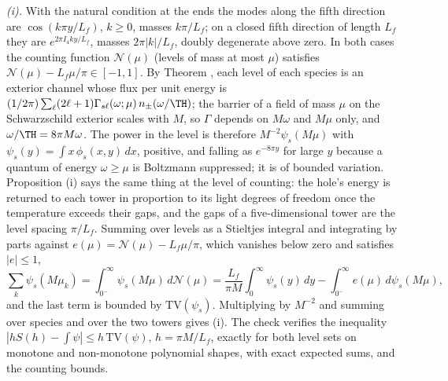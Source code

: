 \emph{(i).} With the natural condition at the ends the modes along the fifth direction are $\cos(k\pi y/L_{f})$, $k \ge 0$, masses $k\pi/L_{f}$; on a closed fifth direction of length $L_{f}$ they are $e^{2\pi I_4 k y/L_{f}}$, masses $2\pi|k|/L_{f}$, doubly degenerate above zero. In both cases the counting function $\mathcal{N}(\mu)$ (levels of mass at most $\mu$) satisfies $\mathcal{N}(\mu) - L_{f}\mu/\pi \in [-1, 1]$. By Theorem , each level of each species is an exterior channel whose flux per unit energy is $(1/2\pi)\sum_{\ell}(2\ell+1)\Gamma_{s\ell}(\omega;\mu)\,n_{\pm}(\omega/\TH)$; the barrier of a field of mass $\mu$ on the Schwarzschild exterior scales with $M$, so $\Gamma$ depends on $M\omega$ and $M\mu$ only, and $\omega/\TH = 8\pi M\omega$. The power in the level is therefore $M^{-2}\psi_{s}(M\mu)$ with $\psi_{s}(y) = \int x\,\phi_{s}(x, y)\,dx$, positive, and falling as $e^{-8\pi y}$ for large $y$ because a quantum of energy $\omega \ge \mu$ is Boltzmann suppressed; it is of bounded variation. Proposition (i) says the same thing at the level of counting: the hole's energy is returned to each tower in proportion to its light degrees of freedom once the temperature exceeds their gaps, and the gaps of a five-dimensional tower are the level spacing $\pi/L_{f}$. Summing over levels as a Stieltjes integral and integrating by parts against $e(\mu) = \mathcal{N}(\mu) - L_{f}\mu/\pi$, which vanishes below zero and satisfies $|e| \le 1$,
\[
\sum_{k}\psi_{s}(M\mu_{k}) = \int_{0^{-}}^{\infty}\psi_{s}(M\mu)\,d\mathcal{N}(\mu) = \frac{L_{f}}{\pi M}\int_{0}^{\infty}\psi_{s}(y)\,dy - \int_{0^{-}}^{\infty} e(\mu)\,d\psi_{s}(M\mu),
\]
and the last term is bounded by $\mathrm{TV}(\psi_{s})$. Multiplying by $M^{-2}$ and summing over species and over the two towers gives (i). The check verifies the inequality $|hS(h) - \int\psi| \le h\,\mathrm{TV}(\psi)$, $h = \pi M/L_{f}$, exactly for both level sets on monotone and non-monotone polynomial shapes, with exact expected sums, and the counting bounds.

